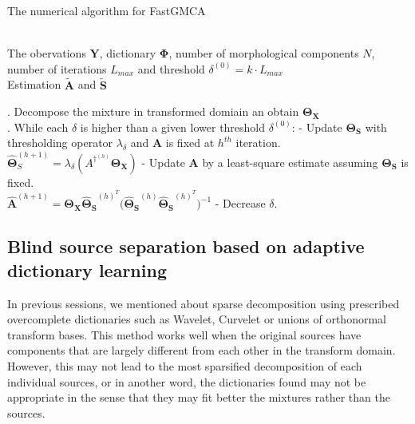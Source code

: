 \begin{algorithm}[!htbp] 
\caption{The numerical algorithm for FastGMCA}
\label{alg:Framwork} 
\begin{algorithmic}
\REQUIRE ~~\\%
The obervations $\mathbf{Y}$, dictionary $\mathbf{\Phi}$, number of morphological components $N$, number of iterations $L_{max}$ and threshold $\delta^{(0)} = k \cdot L_{max}$
\ENSURE ~~\\ %
Estimation $\tilde{\mathbf{A}}$ and $\tilde{\mathbf{S}}$

. Decompose the mixture in transformed domiain an obtain $\mathbf{\Theta_X}$\\

. While each $\delta$ is higher than a given lower threshold $\delta^{(0)}$:
\STATE \quad - Update $\mathbf{\Theta_S}$ with thresholding operator $\lambda_{\delta}$ and $\mathbf{A}$ is fixed at $h^{th}$ iteration.\\
\quad \quad $\mathbf{\hat{\Theta}}^{(h+1)}_S = \lambda_{\delta} (A^{\dagger^{(h)}}\mathbf{\Theta_X})$
\STATE \quad - Update $\mathbf{A}$ by a least-square estimate assuming $\mathbf{\Theta_S}$ is fixed.\\
\quad \quad $\mathbf{\hat{A}}^{(h+1)} = \mathbf{\Theta_X} \mathbf{\hat{\Theta}_S}^{(h)^T} 
\mathbf{(\hat{\Theta}_S}^{(h)} \mathbf{\hat{\Theta}_S}^{(h)^T})^{-1}$
\STATE \quad - Decrease $\delta$.
\end{algorithmic}
\end{algorithm}


\subsection{Blind source separation based on adaptive dictionary learning}
In previous sessions, we mentioned about sparse decomposition using prescribed overcomplete dictionaries such as Wavelet, Curvelet or unions of orthonormal transform bases. This method works well when the original sources have components that are largely different from each other in the transform domain. However, this may not lead to the most sparsified decomposition of each individual sources, or in another word, the dictionaries found may not be appropriate in the sense that they may fit better the mixtures rather than the sources.\\

